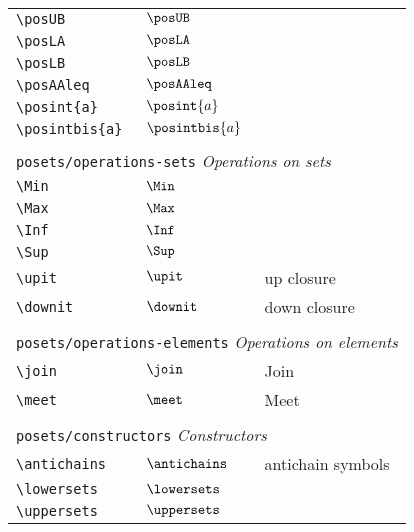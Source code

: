\begin{longtable}{lll}
 {\color[rgb]{0.5,0.5,0.5}\texttt{\textbackslash posUB}} & $\posUB$ & \\ 
 {\color[rgb]{0.5,0.5,0.5}\texttt{\textbackslash posLA}} & $\posLA$ & \\ 
 {\color[rgb]{0.5,0.5,0.5}\texttt{\textbackslash posLB}} & $\posLB$ & \\ 
 {\color[rgb]{0.5,0.5,0.5}\texttt{\textbackslash posAAleq}} & $\posAAleq$ & \\ 
 {\color[rgb]{0.5,0.5,0.5}\texttt{\textbackslash posint\{a\}}} & $\posint{a}$ & \\ 
 {\color[rgb]{0.5,0.5,0.5}\texttt{\textbackslash posintbis\{a\}}} & $\posintbis{a}$ & \\ 
  &  & \\ 
 \multicolumn{3}{l}{{\color[rgb]{0.5,0.5,0.5}\texttt{posets/operations-sets}} \emph{Operations on sets}}\\ 
 \hline
{\color[rgb]{0.5,0.5,0.5}\texttt{\textbackslash Min}} & $\Min$ & \\ 
 {\color[rgb]{0.5,0.5,0.5}\texttt{\textbackslash Max}} & $\Max$ & \\ 
 {\color[rgb]{0.5,0.5,0.5}\texttt{\textbackslash Inf}} & $\Inf$ & \\ 
 {\color[rgb]{0.5,0.5,0.5}\texttt{\textbackslash Sup}} & $\Sup$ & \\ 
 {\color[rgb]{0.5,0.5,0.5}\texttt{\textbackslash upit}} & $\upit$ &  up closure\\ 
 {\color[rgb]{0.5,0.5,0.5}\texttt{\textbackslash downit}} & $\downit$ &  down closure\\ 
  &  & \\ 
 \multicolumn{3}{l}{{\color[rgb]{0.5,0.5,0.5}\texttt{posets/operations-elements}} \emph{Operations on elements}}\\ 
 \hline
{\color[rgb]{0.5,0.5,0.5}\texttt{\textbackslash join}} & $\join$ &  Join\\ 
 {\color[rgb]{0.5,0.5,0.5}\texttt{\textbackslash meet}} & $\meet$ &  Meet\\ 
  &  & \\ 
 \multicolumn{3}{l}{{\color[rgb]{0.5,0.5,0.5}\texttt{posets/constructors}} \emph{Constructors}}\\ 
 \hline
{\color[rgb]{0.5,0.5,0.5}\texttt{\textbackslash antichains}} & $\antichains$ &  antichain symbols\\ 
 {\color[rgb]{0.5,0.5,0.5}\texttt{\textbackslash lowersets}} & $\lowersets$ & \\ 
 {\color[rgb]{0.5,0.5,0.5}\texttt{\textbackslash uppersets}} & $\uppersets$ & \\ 

\end{longtable}
